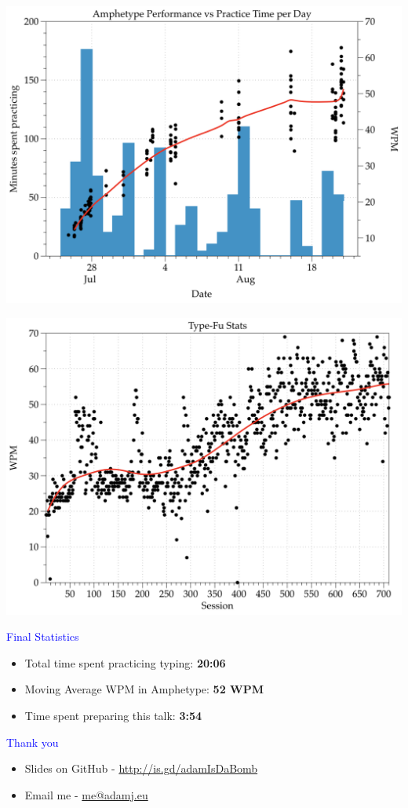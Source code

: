 \documentclass[landscape]{slides}
\begin{document}
\begin{slide}

    \includegraphics[width=\textwidth]{amphetype}

\end{slide}


\begin{slide}

    \includegraphics[width=\textwidth]{type-fu}

\end{slide}


\begin{slide}

    \textcolor{blue}{\Large{Final Statistics}}

    \begin{itemize}
        \item Total time spent practicing typing: \textbf{20:06}
        \item Moving Average WPM in Amphetype: \textbf{52 WPM}
        \item Time spent preparing this talk: \textbf{3:54}
    \end{itemize}

\end{slide}


\begin{slide}
    \textcolor{blue}{\Large{Thank you}}

    \begin{itemize}
        \item Slides on GitHub - \url{http://is.gd/adamIsDaBomb}
        \item Email me - \url{me@adamj.eu}
    \end{itemize}

\end{slide}
\end{document}
